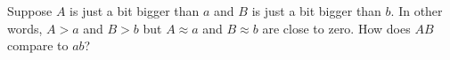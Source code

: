 \documentclass{ximera}
\begin{document}
\begin{problem}

  Suppose $A$ is just a bit bigger than $a$ and $B$ is just a bit
  bigger than $b$.  In other words, $A > a$ and $B > b$ but
  $A \approx a$ and $B \approx b$ are close to zero.  How does $AB$
  compare to $ab$?
  \begin{multipleChoice}
  \end{multipleChoice}
\end{problem}
\end{document}
